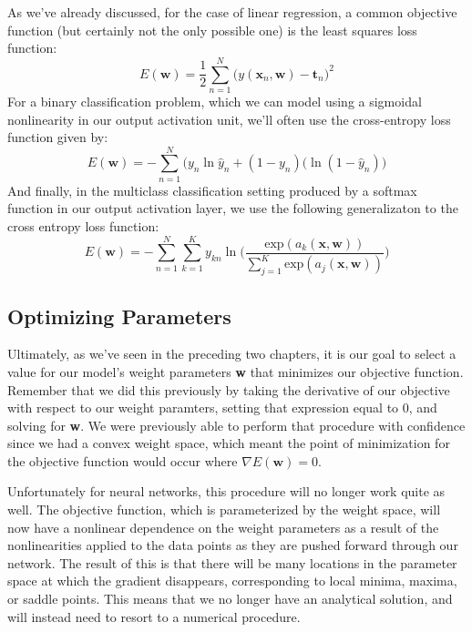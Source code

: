 As we've already discussed, for the case of linear regression, a common objective function (but certainly not the only possible one) is the least squares loss function:
\begin{equation} \label{least-squares-loss-function}
	E(\textbf{w}) = \frac{1}{2} \sum_{n=1}^{N} \bigg(y(\textbf{x}_{n}, \textbf{w}) - \textbf{t}_{n}\bigg)^{2}
\end{equation}
For a binary classification problem, which we can model using a sigmoidal nonlinearity in our output activation unit, we'll often use the cross-entropy loss function given by:
\begin{equation} \label{cross-entropy-loss-function}
	E(\textbf{w}) = - \sum_{n=1}^{N} \bigg(y_{n}\ln{\hat{y}_{n}} + (1 - y_{n})(\ln{(1 - \hat{y}_{n})}\bigg)
\end{equation}
And finally, in the multiclass classification setting produced by a softmax function in our output activation layer, we use the following generalizaton to the cross entropy loss function:
\begin{equation} \label{multiclass-cross-entropy-loss-function}
	E(\textbf{w}) = - \sum_{n=1}^{N} \sum_{k=1}^{K} y_{kn} \ln{\bigg(\frac{\text{exp}(a_{k}(\textbf{x}, \textbf{w}))}{\sum_{j=1}^{K}\text{exp}(a_{j}(\textbf{x}, \textbf{w}))}\bigg)}
\end{equation}


\subsection{Optimizing Parameters}
Ultimately, as we've seen in the preceding two chapters, it is our goal to select a value for our model's weight parameters \textbf{w} that minimizes our objective function. Remember that we did this previously by taking the derivative of our objective with respect to our weight paramters, setting that expression equal to 0, and solving for \textbf{w}. We were previously able to perform that procedure with confidence since we had a convex weight space, which meant the point of minimization for the objective function would occur where $\nabla E(\textbf{w}) = 0$.

Unfortunately for neural networks, this procedure will no longer work quite as well. The objective function, which is parameterized by the weight space, will now have a nonlinear dependence on the weight parameters as a result of the nonlinearities applied to the data points as they are pushed forward through our network. The result of this is that there will be many locations in the parameter space at which the gradient disappears, corresponding to local minima, maxima, or saddle points. This means that we no longer have an analytical solution, and will instead need to resort to a numerical procedure.

